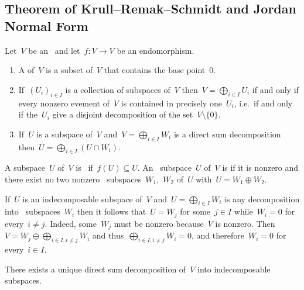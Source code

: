 \documentclass[a4paper,11pt]{scrartcl}
\begin{document}
\subsection{Theorem of Krull--Remak--Schmidt and Jordan Normal Form}
\label{jordan normal form}

Let~$V$ be an~ and let~$f \colon V \to V$ be an endomorphism.

\begin{recall}
  \begin{enumerate}
    \item
      A  of~$V$ is a subset of~$V$ that contains the base point~$0$.
    \item
      If~$(U_i)_{i \in I}$ is a collection of subspaces of~$V$ then~$V = \bigoplus_{i \in I} U_i$ if and only if every nonzero evement of~$V$ is contained in precisely one~$U_i$, i.e.\ if and only if the~$U_i$ give a disjoint decomposition of the set~$V \setminus \{ 0 \}$.
    \item
      If~$U$ is a subspace of~$V$ and~$V = \bigoplus_{i \in I} W_i$ is a direct sum decomposition then~$U = \bigoplus_{i \in I} (U \cap W_i)$.
  \end{enumerate}
\end{recall}

\begin{definition}
  A subspace~$U$ of~$V$ is~ if~$f(U) \subseteq U$.
  An~ subspace~$U$ of~$V$ is  if it is nonzero and there exist no two nonzero~ subspaces~$W_1$,~$W_2$ of~$U$ with~$U = W_1 \oplus W_2$.
\end{definition}

\begin{remark}
  If~$U$ is an indecomposable subspace of~$V$ and~$U = \bigoplus_{i \in I} W_i$ is any decomposition into~ subspaces~$W_i$ then it follows that~$U = W_j$ for some~$j \in I$ while~$W_i = 0$ for every~$i \neq j$.
  Indeed, some~$W_j$ must be nonzero because~$V$ is nonzero.
  Then~$V = W_j \oplus \bigoplus_{i \in I, i \neq j} W_i$ and thus~$\bigoplus_{i \in I, i \neq j} W_i = 0$, and therefore~$W_i = 0$ for every~$i \in I$.
\end{remark}

\begin{proposition}
  There exists a unique direct sum decomposition of~$V$ into indecomposable~ subspaces.
\end{proposition}
\end{document}
